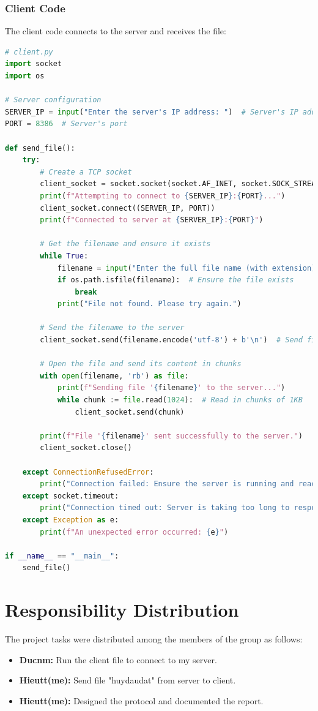\documentclass{article}
\begin{document}
\subsubsection{Client Code}
The client code connects to the server and receives the file:
\begin{lstlisting}[language=Python, caption=Client Code]
# client.py
import socket
import os

# Server configuration
SERVER_IP = input("Enter the server's IP address: ")  # Server's IP address
PORT = 8386  # Server's port

def send_file():
    try:
        # Create a TCP socket
        client_socket = socket.socket(socket.AF_INET, socket.SOCK_STREAM)
        print(f"Attempting to connect to {SERVER_IP}:{PORT}...")
        client_socket.connect((SERVER_IP, PORT))
        print(f"Connected to server at {SERVER_IP}:{PORT}")

        # Get the filename and ensure it exists
        while True:
            filename = input("Enter the full file name (with extension): ")
            if os.path.isfile(filename):  # Ensure the file exists
                break
            print("File not found. Please try again.")

        # Send the filename to the server
        client_socket.send(filename.encode('utf-8') + b'\n')  # Send filename with newline delimiter

        # Open the file and send its content in chunks
        with open(filename, 'rb') as file:
            print(f"Sending file '{filename}' to the server...")
            while chunk := file.read(1024):  # Read in chunks of 1KB
                client_socket.send(chunk)

        print(f"File '{filename}' sent successfully to the server.")
        client_socket.close()

    except ConnectionRefusedError:
        print("Connection failed: Ensure the server is running and reachable.")
    except socket.timeout:
        print("Connection timed out: Server is taking too long to respond.")
    except Exception as e:
        print(f"An unexpected error occurred: {e}")

if __name__ == "__main__":
    send_file()

\end{lstlisting}

\section{Responsibility Distribution}
The project tasks were distributed among the members of the group as follows:
\begin{itemize}
    \item \textbf{Ducnm:} Run the client file to connect to my server.
    \item \textbf{Hieutt(me):} Send file "huydaudat" from server to client.
    \item \textbf{Hieutt(me):} Designed the protocol and documented the report.
\end{itemize}
\end{document}
